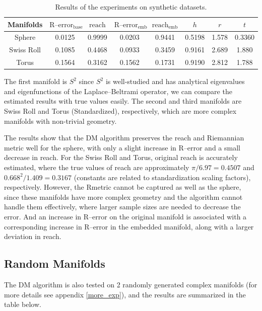\begin{table}[htbp]
    \caption{Results of the experiments on synthetic datasets.}
    \centering
    \begin{tabular}{cccccccc}
    \toprule
    Manifolds & $\text{R--error}_{\text{base}}$ & $\text{reach}$ & $\text{R--error}_{\text{emb}}$ & $\text{reach}_{\text{emb}}$ & $h$ & $r$ & $t$ \\
    \midrule
    Sphere & 0.0125 & 0.9999 & 0.0203 & 0.9441 & 0.5198 & 1.578 & 0.3360\\
    Swiss Roll & 0.1085 & 0.4468 & 0.0933 & 0.3459 & 0.9161 & 2.689 & 1.880 \\
    Torus & 0.1564 & 0.3162 & 0.1562 & 0.1731 & 0.9190 & 2.812 & 1.788\\
    \bottomrule
    \end{tabular}
\end{table}


The first manifold is $S^2$ since $S^2$ is well-studied and has analytical eigenvalues and eigenfunctions of the Laplace--Beltrami operator, we can compare the estimated results with true values easily. The second and third manifolds are Swiss Roll and Torus (Standardized), respectively, which are more complex manifolds with non-trivial geometry.

The results show that the DM algorithm preserves the reach and Riemannian metric well for the sphere, with only a slight increase in R--error and a small decrease in reach. For the Swiss Roll and Torus, original reach is accurately estimated, where the true values of reach are approximately $\pi/6.97 = 0.4507$ and $0.668^2/1.409 = 0.3167$ (constants are related to standardization scaling factors), respectively. However, the Rmetric cannot be captured as well as the sphere, since these manifolds have more complex geometry and the algorithm cannot handle them effectively, where larger sample sizes are needed to decrease the error. And an increase in R--error on the original manifold is associated with a corresponding increase in R--error in the embedded manifold, along with a larger deviation in reach.

\subsection{Random Manifolds}
The DM algorithm is also tested on 2 randomly generated complex manifolds (for more details see appendix \ref{more_exp}), and the results are summarized in the table below.


